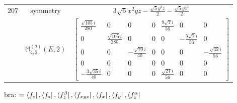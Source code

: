\documentclass[fleqn,8pt,landscape]{jsarticle}
\begin{document}
\begin{longtable}{ccc}
$ 207 $ & $ \text{symmetry} $ & $ 3 \sqrt{5} x^{2} y z - \frac{\sqrt{5} y^{3} z}{2} - \frac{\sqrt{5} y z^{3}}{2} $ \\
$  $ & $ \mathbb{M}_{4,2}^{(a)}(E,2) $ & $ \begin{bmatrix} \frac{\sqrt{105} i}{280} & 0 & 0 & 0 & \frac{9 \sqrt{7} i}{56} & 0 & 0 \\ 0 & \frac{\sqrt{105} i}{280} & 0 & 0 & 0 & - \frac{5 \sqrt{7} i}{56} & 0 \\ 0 & 0 & - \frac{\sqrt{70} i}{40} & 0 & 0 & 0 & - \frac{\sqrt{42} i}{56} \\ 0 & 0 & 0 & 0 & 0 & 0 & 0 \\ - \frac{3 \sqrt{35} i}{40} & 0 & 0 & 0 & \frac{\sqrt{21} i}{56} & 0 & 0 \end{bmatrix} $ \\ \hline
\end{longtable}
bra: $=\bra{f_{c}}, \bra{f_{s}}, \bra{f_{z}^{\beta}}, \bra{f_{xyz}}, \bra{f_{x}}, \bra{f_{y}}, \bra{f_{z}^{\alpha}}$
\end{document}
